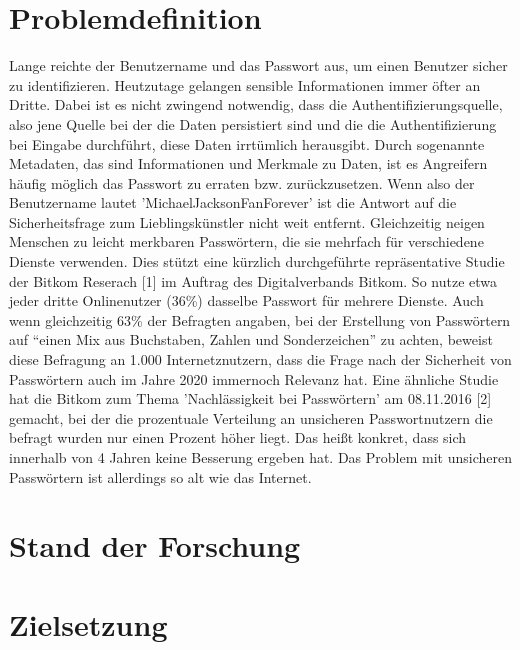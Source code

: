 \section{Problemdefinition}
Lange reichte der Benutzername und das Passwort aus, um einen Benutzer sicher zu identifizieren. Heutzutage gelangen sensible Informationen immer öfter an Dritte. Dabei ist es nicht zwingend notwendig, dass die Authentifizierungsquelle, also jene Quelle bei der die Daten persistiert sind und die die Authentifizierung bei Eingabe durchführt, diese Daten irrtümlich herausgibt. Durch sogenannte Metadaten, das sind Informationen und Merkmale zu Daten, ist es Angreifern häufig möglich das Passwort zu erraten bzw. zurückzusetzen. Wenn also der Benutzername lautet 'MichaelJacksonFanForever' ist die Antwort auf die Sicherheitsfrage zum Lieblingskünstler nicht weit entfernt.
Gleichzeitig neigen Menschen zu leicht merkbaren Passwörtern, die sie mehrfach für verschiedene Dienste verwenden. Dies stützt eine kürzlich durchgeführte repräsentative Studie der Bitkom Reserach [1] im Auftrag des Digitalverbands Bitkom. So nutze etwa jeder dritte Onlinenutzer (36\%) dasselbe Passwort für mehrere Dienste. Auch wenn gleichzeitig 63\% der Befragten angaben, bei der Erstellung von Passwörtern auf ``einen Mix aus Buchstaben, Zahlen und Sonderzeichen'' zu achten, beweist diese Befragung an 1.000 Internetznutzern, dass die Frage nach der Sicherheit von Passwörtern auch im Jahre 2020 immernoch Relevanz hat. Eine ähnliche Studie hat die Bitkom zum Thema 'Nachlässigkeit bei Passwörtern' am 08.11.2016 [2] gemacht, bei der die prozentuale Verteilung an unsicheren Passwortnutzern die befragt wurden nur einen Prozent höher liegt. Das heißt konkret, dass sich innerhalb von 4 Jahren keine Besserung ergeben hat. Das Problem mit unsicheren Passwörtern ist allerdings so alt wie das Internet.

\section{Stand der Forschung}
\blindtext

\section{Zielsetzung}
\blindtext
